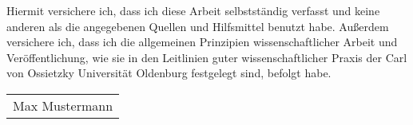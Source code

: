 \thispagestyle{empty}
Hiermit versichere ich, dass ich diese Arbeit selbstständig verfasst und keine anderen als die angegebenen Quellen und Hilfsmittel benutzt habe. Außerdem versichere ich, dass ich die allgemeinen Prinzipien wissenschaftlicher Arbeit und Veröffentlichung, wie sie in den Leitlinien guter wissenschaftlicher Praxis der Carl von Ossietzky Universität Oldenburg festgelegt sind, befolgt habe.

\addvspace{2.0cm}

\begin{tabular}{@{}l@{}}\hline
Max Mustermann
\end{tabular}